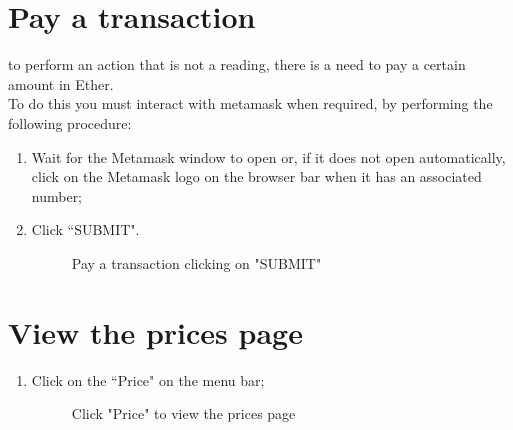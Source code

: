 \documentclass[ManualeUtente]{subfiles}
\begin{document}
\section{Pay a transaction}
to perform an action that is not a reading, there is a need to pay a certain amount in Ether. \\
To do this you must interact with metamask when required, by performing the following procedure:
\begin{enumerate}
	\item Wait for the Metamask window to open or, if it does not open automatically, click on the Metamask logo on the browser bar when it has an associated number;
	\item Click \textquotedblleft SUBMIT".
	\begin{figure}[H]
		\centering
		\caption{Pay a transaction clicking on "SUBMIT"}
		\label{fig:Pay a transaction clicking on "SUBMIT"}
	\end{figure}
\end{enumerate}


\section{View the prices page}
\begin{enumerate}
	\item Click on the \textquotedblleft Price" on the menu bar;
	\begin{figure}[H]
		\centering
		\caption{Click "Price" to view the prices page}
		\label{fig:Click "Price" to view the prices page}
	\end{figure}
\end{enumerate}
\end{document}
